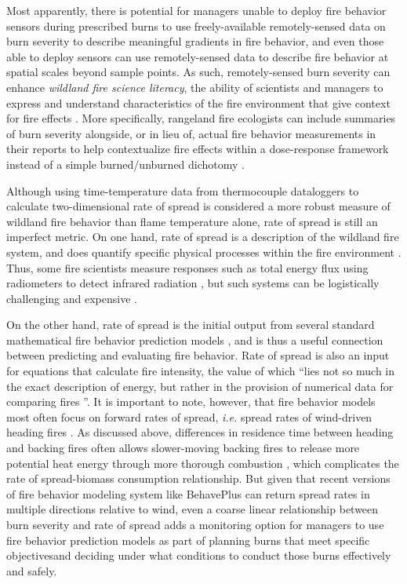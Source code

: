 \documentclass[fire,article,submit,oneauthor,pdftex]{Definitions/mdpi}
\begin{document}
Most apparently, there is potential for managers unable to deploy fire behavior sensors during prescribed burns to use freely-available remotely-sensed data on burn severity to describe meaningful gradients in fire behavior, and even those able to deploy sensors can use remotely-sensed data to describe fire behavior at  spatial scales beyond sample points. 
As such, remotely-sensed burn severity can enhance \emph{wildland fire science literacy}, the ability of scientists and managers to express and understand characteristics of the fire environment that give context for fire effects \cite{mcgranahan2018, mcgranahan2022a}. 
More specifically, rangeland fire ecologists can include summaries of burn severity alongside, or in lieu of, actual fire behavior measurements in their reports to help contextualize fire effects within a dose-response framework instead of a simple burned/unburned dichotomy \cite{smith2016a}. 

Although using time-temperature data from thermocouple dataloggers to calculate two-dimensional rate of spread is considered a more robust measure of wildland fire behavior than flame temperature alone, rate of spread is still an imperfect metric.
On one hand, rate of spread is a description of the wildland fire system, and does quantify specific physical processes within the fire environment \cite{finney2021}. 
Thus, some fire scientists measure responses such as total energy flux using radiometers to detect infrared radiation \cite{butler2004, kremens2012, obrien2018}, but such systems can be logistically challenging and expensive \cite{butler2010}. 

On the other hand, rate of spread is the initial output from several standard mathematical fire behavior prediction models \cite{rothermel1972,noble1980}, and is thus a useful connection between predicting and evaluating fire behavior. 
Rate of spread is also an input for equations that calculate fire intensity, the value of which ``lies not so much in the exact description of energy, but rather in the provision of numerical data for comparing fires \cite[][p. 354]{alexander1982}''. 
It is important to note, however, that fire behavior models most often focus on forward rates of spread, \emph{i.e.} spread rates of wind-driven heading fires \cite{rothermel1983}. 
As discussed above, differences in residence time between heading and backing fires often allows slower-moving backing fires to release more potential heat energy through more thorough combustion \cite{trollope1984}, which complicates the rate of spread-biomass consumption relationship.
But given that recent versions of fire behavior modeling system like BehavePlus \cite{heinsch2010} can return spread rates in multiple directions relative to wind, even a coarse linear relationship between burn severity and rate of spread adds a monitoring option for managers to use fire behavior prediction models as part of planning burns that meet specific objectives\textemdash and deciding under what conditions to conduct those burns effectively and safely. 
\end{document}
